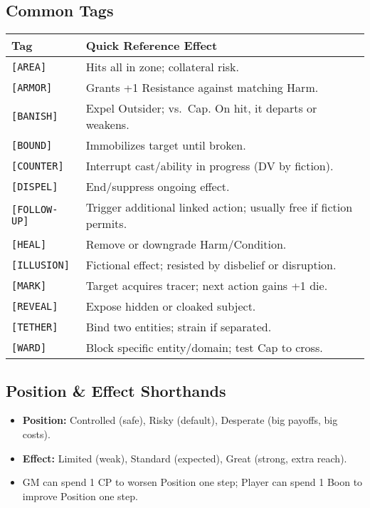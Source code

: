 \subsection{Common Tags}
\begin{center}
\begin{tabular}{|p{3.5cm}|p{10.0cm}|}
\hline
\textbf{Tag} & \textbf{Quick Reference Effect} \\ \hline
\texttt{[AREA]} & Hits all in zone; collateral risk. \\ \hline
\texttt{[ARMOR]} & Grants +1 Resistance against matching Harm. \\ \hline
\texttt{[BANISH]} & Expel Outsider; vs.\ Cap. On hit, it departs or weakens. \\ \hline
\texttt{[BOUND]} & Immobilizes target until broken. \\ \hline
\texttt{[COUNTER]} & Interrupt cast/ability in progress (DV by fiction). \\ \hline
\texttt{[DISPEL]} & End/suppress ongoing effect. \\ \hline
\texttt{[FOLLOW-UP]} & Trigger additional linked action; usually free if fiction permits. \\ \hline
\texttt{[HEAL]} & Remove or downgrade Harm/Condition. \\ \hline
\texttt{[ILLUSION]} & Fictional effect; resisted by disbelief or disruption. \\ \hline
\texttt{[MARK]} & Target acquires tracer; next action gains +1 die. \\ \hline
\texttt{[REVEAL]} & Expose hidden or cloaked subject. \\ \hline
\texttt{[TETHER]} & Bind two entities; strain if separated. \\ \hline
\texttt{[WARD]} & Block specific entity/domain; test Cap to cross. \\ \hline
\end{tabular}
\end{center}

\subsection{Position \& Effect Shorthands}
\begin{itemize}
  \item \textbf{Position:} Controlled (safe), Risky (default), Desperate (big payoffs, big costs).
  \item \textbf{Effect:} Limited (weak), Standard (expected), Great (strong, extra reach).
  \item GM can spend 1 CP to worsen Position one step; Player can spend 1 Boon to improve Position one step.
\end{itemize}

